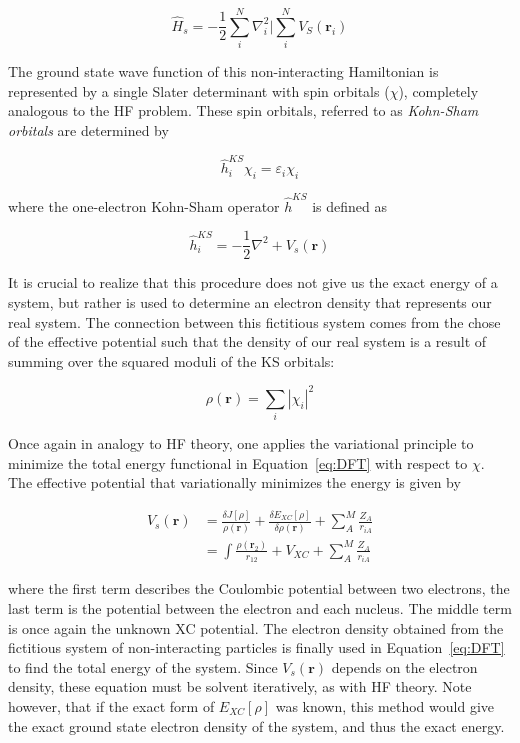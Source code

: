 \begin{doublespace}
\begin{equation}
  \hat{H}_s = -\frac{1}{2}\sum_i^N\nabla_i^2 | \sum_i^N V_S(\mathbf{r}_i)
\end{equation}

\noindent The ground state wave function of this non-interacting Hamiltonian is
represented by a single Slater determinant with spin orbitals ($\chi$),
completely analogous to the HF problem. These spin orbitals, referred to as
\emph{Kohn-Sham orbitals} are determined by

\begin{equation}
  \hat{h}_i^{KS} \chi_i = \varepsilon_i \chi_i
  \label{eq:kohnsham}
\end{equation}

\noindent where the one-electron Kohn-Sham operator $\hat{h}^{KS}$ is defined
as

\begin{equation}
  \hat{h}_i^{KS} = -\frac{1}{2}\nabla^2 + V_s(\mathbf{r})
  \label{eq:ksoperator}
\end{equation}

It is crucial to realize that this procedure does not give us the exact energy
of a system, but rather is used to determine an electron density that
represents our real system. The connection between this fictitious system comes
from the chose of the effective potential such that the density of our real
system is a result of summing over the squared moduli of the KS orbitals:

\begin{equation}
  \rho(\mathbf{r}) = \sum_i | \chi_i |^2
\end{equation}

Once again in analogy to HF theory, one applies the variational principle to
minimize the total energy functional in Equation~\ref{eq:DFT} with respect to
$\chi$. The effective potential that variationally minimizes the energy is
given by\cite{Parr1995}

\begin{equation}
\begin{split}
  V_s(\mathbf{r}) &= \frac{\delta J[\rho]}{\rho(\mathbf{r})} + \frac{\delta E_{XC}[\rho]}{\delta \rho(\mathbf{r})} + \sum_A^M \frac{Z_A}{r_{iA}} \\
  &= \int\frac{\rho(\mathbf{r}_2)}{r_{12}} + V_{XC} + \sum_A^M \frac{Z_A}{r_{iA}}
\end{split}
\end{equation}

\noindent where the first term describes the Coulombic potential between two
electrons, the last term is the potential between the electron and each
nucleus. The middle term is once again the unknown XC potential. The electron
density obtained from the fictitious system of non-interacting particles is
finally used in Equation~\ref{eq:DFT} to find the total energy of the system.
Since $V_s(\mathbf{r})$ depends on the electron density, these equation must be
solvent iteratively, as with HF theory. Note however, that if the exact form of
$E_{XC}[\rho]$ was known, this method would give the exact ground state
electron density of the system, and thus the exact energy.


\end{doublespace}
